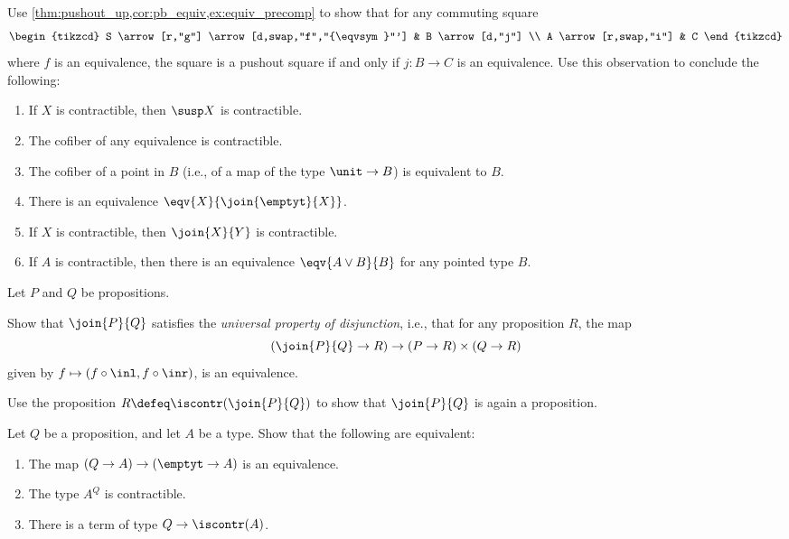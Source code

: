 \begin{exercises}
\exercise \label{ex:pushout_equiv}Use \cref{thm:pushout_up,cor:pb_equiv,ex:equiv_precomp} to show that for any commuting square
\begin{equation*}
\begin{tikzcd}
S \arrow[r,"g"] \arrow[d,swap,"f","{\eqvsym}"'] & B \arrow[d,"j"] \\
A \arrow[r,swap,"i"] & C
\end{tikzcd}
\end{equation*} 
where $f$ is an equivalence, the square is a pushout square if and only if $j:B\to C$ is an equivalence.
Use this observation to conclude the following:
\begin{enumerate}
\item If $X$ is contractible, then $\susp X$ is contractible.
\item The cofiber of any equivalence is contractible.
\item The cofiber of a point in $B$ (i.e., of a map of the type $\unit\to B$) is equivalent to $B$.
\item There is an equivalence $\eqv{X}{\join{\emptyt}{X}}$.
\item If $X$ is contractible, then $\join{X}{Y}$ is contractible. 
\item If $A$ is contractible, then there is an equivalence $\eqv{A\vee B}{B}$ for any pointed type $B$.
\end{enumerate}
\exercise \label{ex:join_propositions}Let $P$ and $Q$ be propositions.
\begin{subexenum}
\item Show that $\join{P}{Q}$ satisfies the \emph{universal property of disjunction}, i.e., that for any proposition $R$, the map
\begin{equation*}
(\join{P}{Q}\to R)\to (P\to R)\times (Q\to R)
\end{equation*}
given by $f\mapsto (f\circ \inl,f\circ \inr)$, is an equivalence.
\item Use the proposition $R\defeq\iscontr(\join{P}{Q})$ to show that $\join{P}{Q}$ is again a proposition.
\end{subexenum}
\exercise Let $Q$ be a proposition, and let $A$ be a type. Show that the following are equivalent:
\begin{enumerate}
\item The map $(Q\to A)\to(\emptyt\to A)$ is an equivalence.
\item The type $A^Q$ is contractible.
\item There is a term of type $Q\to\iscontr(A)$.

\end{enumerate}
\end{exercises}
